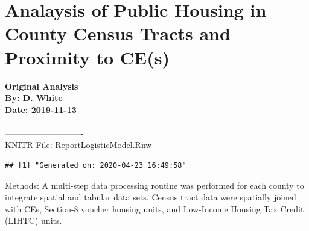 \documentclass{article}\usepackage[]{graphicx}\usepackage[]{color}
\makeatletter
\newenvironment{kframe}{%
 \def\at@end@of@kframe{}%
 \ifinner\ifhmode%
  \def\at@end@of@kframe{\end{minipage}}%
  \begin{minipage}{\columnwidth}%
 \fi\fi%
 \def\FrameCommand##1{\hskip\@totalleftmargin \hskip-\fboxsep
 \colorbox{shadecolor}{##1}\hskip-\fboxsep
     \hskip-\linewidth \hskip-\@totalleftmargin \hskip\columnwidth}%
 \MakeFramed {\advance\hsize-\width
   \@totalleftmargin\z@ \linewidth\hsize
   \@setminipage}}%
 {\par\unskip\endMakeFramed%
 \at@end@of@kframe}
\newenvironment{knitrout}{}{} %
\makeatother
\begin{document}
\section*{Analaysis of Public Housing in County Census Tracts and \\Proximity to CE(s)}

\textbf{Original Analysis}\\
\textbf{By: D. White}\\
\textbf{Date: 2019-11-13}\\
\\
----------------------------\\
\break
KNITR File: Report\textunderscore Logistic\textunderscore Model.Rnw \\
\begin{knitrout}
\color{fgcolor}\begin{kframe}
\begin{verbatim}
## [1] "Generated on: 2020-04-23 16:49:58"
\end{verbatim}
\end{kframe}
\end{knitrout}
  





Methods: A multi-step data processing routine was performed for each county to integrate spatial and tabular data sets. Census tract data were spatially joined with CEs, Section-8 voucher housing units, and Low-Income Housing Tax Credit (LIHTC) units. 
\\
\end{document}
